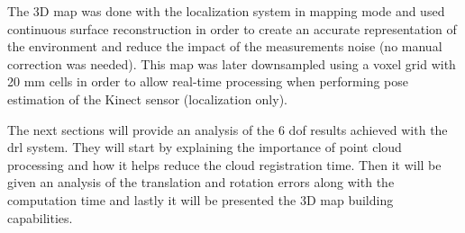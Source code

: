 The 3D map was done with the localization system in mapping mode and used continuous surface reconstruction in order to create an accurate representation of the environment and reduce the impact of the measurements noise (no manual correction was needed). This map was later downsampled using a voxel grid with 20 mm cells in order to allow real-time processing when performing pose estimation of the Kinect sensor (localization only).

The next sections will provide an analysis of the 6 \gls{dof} results achieved with the \gls{drl} system. They will start by explaining the importance of point cloud processing and how it helps reduce the cloud registration time. Then it will be given an analysis of the translation and rotation errors along with the computation time and lastly it will be presented the 3D map building capabilities.


